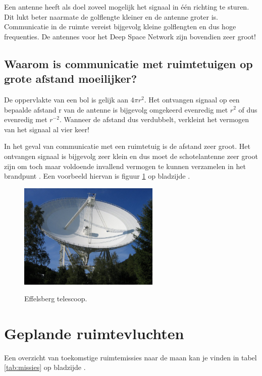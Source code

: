 Een antenne heeft als doel zoveel mogelijk het signaal in één richting te sturen. Dit lukt beter naarmate de golflengte kleiner en de antenne groter is. Communicatie in de ruimte vereist bijgevolg kleine golflengten en dus hoge frequenties. De antennes voor het Deep Space Network zijn bovendien zeer groot!

\subsection{Waarom is communicatie met ruimtetuigen op grote afstand moeilijker?}

De oppervlakte van een bol is gelijk aan $4\pi r^{2}$. Het ontvangen signaal op een bepaalde afstand r van de antenne is bijgevolg omgekeerd evenredig met $r^{2}$ of dus evenredig met $r^{-2}$. Wanneer de afstand dus verdubbelt, verkleint het vermogen van het signaal al vier keer! 

In het geval van communicatie met een ruimtetuig is de afstand zeer groot. Het ontvangen signaal is bijgevolg zeer klein en dus moet de schotelantenne zeer groot zijn om toch maar voldoende invallend vermogen te kunnen verzamelen in het brandpunt \cite{radiocontact}. Een voorbeeld hiervan is figuur \ref{fig:effelsberg} op bladzijde \pageref{fig:effelsberg}.

\begin{figure}[ht]
  \centering
  \includegraphics[width=0.6\textwidth]{voorbeeld_figuren/paraboolantenne}
  \caption{Effelsberg telescoop.} 
  \cite{effelsberg}
  \label{fig:effelsberg}
\end{figure}

\section{Geplande ruimtevluchten}

Een overzicht van toekomstige ruimtemissies naar de maan kan je vinden in tabel \ref{tab:missies} op bladzijde \pageref{tab:missies}.

